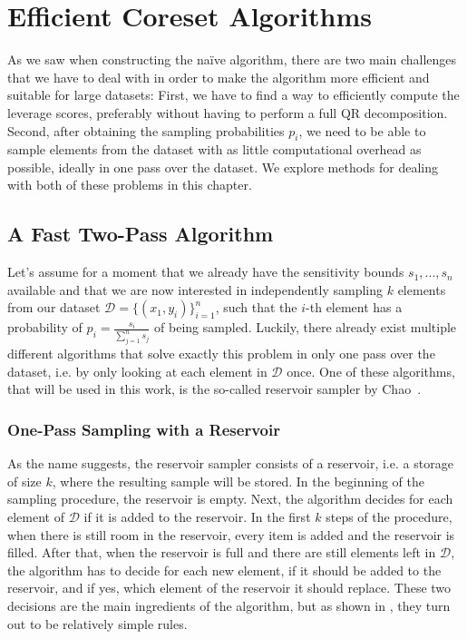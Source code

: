 \section{Efficient Coreset Algorithms}

As we saw when constructing the na\"ive algorithm, there are two
main challenges that we have to deal with in order to make the
algorithm more efficient and suitable for large datasets:
First, we have to find a way to efficiently compute the
leverage scores, preferably without
having to perform a full QR decomposition.
Second, after obtaining the sampling probabilities $p_i$, we
need to be able to sample elements from the dataset
with as little computational overhead as possible, ideally
in one pass over the dataset.
We explore methods for dealing with both of these problems in this
chapter.

\subsection{A Fast Two-Pass Algorithm}

Let's assume for a moment that we already have the sensitivity
bounds $s_1, ..., s_n$ available and that we are now
interested in independently sampling $k$ elements from our dataset
$\mathcal{D} = \{(x_1, y_i)\}_{i=1}^n$, such that the
$i$-th element has a probability of
$p_i = \frac{s_i}{\sum_{j=1}^n s_j}$ of being sampled.
Luckily, there already exist multiple different algorithms
that solve exactly this problem in only one pass over the
dataset, i.e. by only looking at each element in $\mathcal{D}$
once. One of these algorithms, that will be used in this
work, is the so-called reservoir sampler by Chao~\cite{reservoir-sampler}.

\subsubsection{One-Pass Sampling with a Reservoir}

As the name suggests, the reservoir sampler consists of a reservoir,
i.e. a storage of size $k$, where the resulting sample will be stored.
In the beginning of the sampling procedure, the reservoir is empty.
Next, the algorithm decides for each element of $\mathcal{D}$
if it is added to the reservoir. In the first $k$ steps of the
procedure, when there is still room in the reservoir, every item is
added and the reservoir is filled. After that, when the reservoir is
full and there are still elements left in $\mathcal{D}$,
the algorithm has to decide for each new element, if it should be added
to the reservoir, and if yes,
which element of the reservoir it should replace.
These two decisions are the main ingredients of the algorithm, but
as shown in \cite{reservoir-sampler}, they turn out to be
relatively simple rules.

